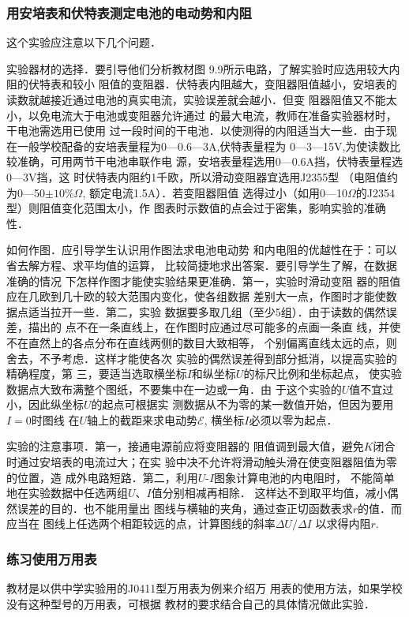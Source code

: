 \subsubsection{用安培表和伏特表测定电池的电动势和内阻}
这个实验应注意以下几个问题．

实验器材的选择．要引导他们分析教材图
9.9所示电路，了解实验时应选用较大内阻的伏特表和较小
阻值的变阻器．伏特表内阻越大，变阻器阻值越小，安培表的
读数就越接近通过电池的真实电流，实验误差就会越小．但变
阻器阻值又不能太小，以免电流大于电池或变阻器允许通过
的最大电流，教师在准备实验器材时，干电池需选用已使用
过一段时间的干电池．以使测得的内阻适当大一些．由于现
在一般学校配备的安培表量程为0—0.6—3A,伏特表量程为
0—3—15V,为使读数比较准确，可用两节干电池串联作电
源，安培表量程选用0—0.6A挡，伏特表量程选0—3V挡，这
时伏特表内阻约1千欧，所以滑动变阻器宜选用J2355型
（电阻值约为0—50$\pm 10\%\Omega$, 额定电流1.5A）．若变阻器阻值
选得过小（如用0—10$\Omega$的J2354型）则阻值变化范围太小，作
图表时示数值的点会过于密集，影响实验的准确性．

如何作图．应引导学生认识用作图法求电池电动势
和内电阻的优越性在于：可以省去解方程、求平均值的运算，
比较简捷地求出答案．要引导学生了解，在数据准确的情况
下怎样作图才能使实验结果更准确．第一，实验时滑动变阻
器的阻值应在几欧到几十欧的较大范围内变化，使各组数据
差别大一点，作图时才能使数据点适当拉开一些．第二，实验
数据要多取几组（至少5组）．由于读数的偶然误差，描出的
点不在一条直线上，在作图时应通过尽可能多的点画一条直
线，并使不在直然上的各点分布在直线两侧的数目大致相等，
个别偏离直线太远的点，则舍去，不予考虑．这样才能使各次
实验的偶然误差得到部分抵消，以提高实验的精确程度，第
三，要适当选取横坐标$I$和纵坐标$U$的标尺比例和坐标起点，
使实验数据点大致布满整个图纸，不要集中在一边或一角．由
于这个实验的$U$值不宜过小，因此纵坐标$U$的起点可根据实
测数据从不为零的某一数值开始，但因为要用$I=0$时图线
在$U$轴上的截距来求电动势$\mathcal{E}$, 横坐标$I$必须以零为起点．

实验的注意事项．第一，接通电源前应将变阻器的
阻值调到最大值，避免$K$闭合时通过安培表的电流过大；在实
验中决不允许将滑动触头滑在使变阻器阻值为零的位置，造
成外电路短路．第二，利用$U$-$I$图象计算电池的内电阻时，
不能简单地在实验数据中任选两组$U$、$I$值分别相减再相除．
这样达不到取平均值，减小偶然误差的目的．也不能用量出
图线与横轴的夹角，通过查正切函数表求$r$的值．而应当在
图线上任选两个相距较远的点，计算图线的斜率$\Delta U/\Delta I$
以求得内阻$r$.


\subsubsection{练习使用万用表}
教材是以供中学实验用的J0411型万用表为例来介绍万
用表的使用方法，如果学校没有这种型号的万用表，可根据
教材的要求结合自己的具体情况做此实验．

